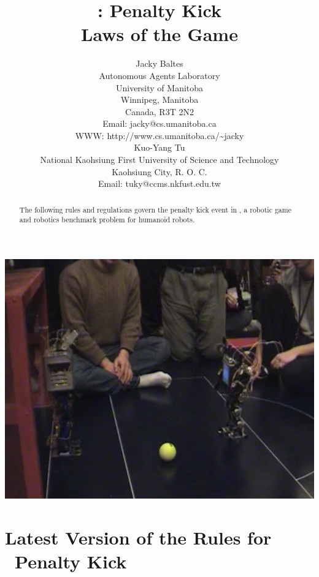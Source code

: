 \documentclass[12pt]{hurocup}
\begin{document}
\title{\HuroCup: Penalty Kick\\
  Laws of the Game \thisyear}


\author{Jacky Baltes\\
Autonomous Agents Laboratory\\
University of Manitoba\\
Winnipeg, Manitoba\\
Canada, R3T 2N2\\
Email: jacky@cs.umanitoba.ca\\
WWW: http://www.cs.umanitoba.ca/\~{ }jacky\\[5mm]
Kuo-Yang Tu\\
National Kaohsiung First University of Science and Technology\\
Kaohsiung City, R. O. C.\\
Email: tuky@ccms.nkfust.edu.tw\\
}

\maketitle

\begin{center}
 \includegraphics[width=0.7\linewidth]{Figures/penalty-kick-life}
\end{center}

\begin{abstract}
The following rules and regulations govern the penalty kick event in
\HuroCup, a robotic game and robotics benchmark problem for humanoid
robots.
%
\end{abstract}

\section*{Latest Version of the Rules for \HuroCup\ Penalty Kick}
\label{sec:updates}
\end{document}
